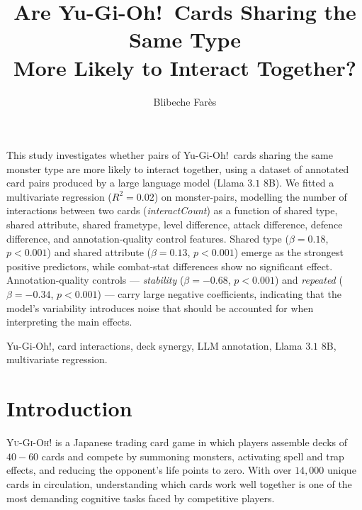 \documentclass[10pt, a4paper]{article}
\title{Are Yu-Gi-Oh!\ Cards Sharing the Same Type\\
       More Likely to Interact Together?}
\author{Blibeche Farès}
\begin{document}
\thispagestyle{empty}

\maketitle

\begin{paperabstract}
This study investigates whether pairs of Yu-Gi-Oh!\ cards sharing
the same monster type are more likely to interact together,
using a dataset of annotated card pairs produced by a
large language model (Llama $3.1$ $8$B). We fitted a multivariate regression
($R^2 = 0.02$) on monster-pairs, modelling the number of interactions between two cards
(\textit{interactCount}) as a function of shared type, shared
attribute, shared frametype, level difference, attack difference,
defence difference, and annotation-quality control features. Shared
type ($\beta = 0.18$, $p < 0.001$) and shared attribute
($\beta = 0.13$, $p < 0.001$) emerge as the strongest positive
predictors, while combat-stat differences show no significant
effect. Annotation-quality controls --- \textit{stability} ($\beta = -0.68$, $p < 0.001$) and
\textit{repeated} ($\beta = -0.34$, $p < 0.001$) --- carry large negative coefficients, 
indicating that the model's variability introduces noise that should be 
accounted for when interpreting the main effects.
\end{paperabstract}

\begin{keywords}
Yu-Gi-Oh!, card interactions, deck synergy, LLM annotation,
Llama $3.1$ $8$B, multivariate regression.
\end{keywords}

\startbody

\section{Introduction}

\lettrine[lines=4]{Y}{u-Gi-Oh!} is a Japanese trading card game in
which players assemble decks of $40-60$ cards and compete by summoning
monsters, activating spell and trap effects, and reducing the
opponent's life points to zero. With over $14{,}000$ unique cards in
circulation, understanding which cards work well together is one of
the most demanding cognitive tasks faced by competitive players.
\end{document}
